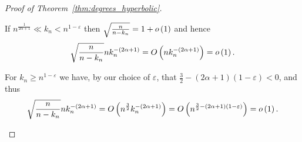 \begin{proof}[Proof of Theorem~\ref{thm:degrees_hyperbolic}]
\begin{enumerate}[\upshape (i)]
If $n^{\frac{1}{2\alpha + 1}} \ll k_n < n^{1-\varepsilon}$ then $\sqrt{\frac{n}{n-k_n}} = 1 + o\left(1\right)$ and hence
\[
	\sqrt{\frac{n}{n-k_n}} n k_n^{-(2\alpha + 1)} = O\left(n k_n^{-(2\alpha + 1)}\right) = o\left(1\right).
\]

For $k_n \ge n^{1 - \varepsilon}$ we have, by our choice of $\varepsilon$, that $\frac{3}{2} - (2\alpha + 1)(1-\varepsilon) < 0$, and thus
\[
	\sqrt{\frac{n}{n-k_n}} n k_n^{-(2\alpha + 1)} = O\left(n^{\frac{3}{2}} k_n^{-(2\alpha + 1)}\right)
	= O\left(n^{\frac{3}{2} - (2\alpha + 1)(1-\varepsilon)}\right) = o\left(1\right).
\]
\end{enumerate}
\end{proof}

